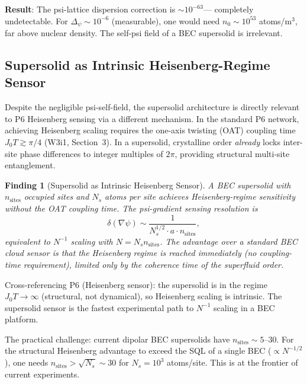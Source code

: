 \documentclass[11pt]{article}
\newtheorem{finding}[theorem]{Finding}
\theoremstyle{definition}
\theoremstyle{remark}
\begin{document}
\textbf{Result}: The psi-lattice dispersion correction is $\sim 10^{-63}$---
completely undetectable.  For $\Delta_\psi \sim 10^{-6}$ (measurable), one would
need $n_0 \sim 10^{53}$ atoms/m$^3$, far above nuclear density.  The self-psi
field of a BEC supersolid is irrelevant.

\subsection{Supersolid as Intrinsic Heisenberg-Regime Sensor}

Despite the negligible psi-self-field, the supersolid architecture is directly
relevant to P6 Heisenberg sensing via a different mechanism.  In the standard P6
network, achieving Heisenberg scaling requires the one-axis twisting (OAT)
coupling time $J_0 T \gtrsim \pi/4$ (W3i1, Section~3).  In a supersolid,
crystalline order \emph{already} locks inter-site phase differences to integer
multiples of $2\pi$, providing structural multi-site entanglement.

\begin{finding}[Supersolid as Intrinsic Heisenberg Sensor]
A BEC supersolid with $n_{\mathrm{sites}}$ occupied sites and $N_s$ atoms per
site achieves Heisenberg-regime sensitivity without the OAT coupling time.
The psi-gradient sensing resolution is
\begin{equation}
  \delta(\nabla\psi) \sim \frac{1}{N_s^{1/2}\cdot a \cdot n_{\mathrm{sites}}},
  \label{eq:ss-sensitivity}
\end{equation}
equivalent to $N^{-1}$ scaling with $N = N_s n_{\mathrm{sites}}$.
The advantage over a standard BEC cloud sensor is that the Heisenberg regime
is reached \emph{immediately} (no coupling-time requirement), limited only by
the coherence time of the superfluid order.
\end{finding}

Cross-referencing P6 (Heisenberg sensor): the supersolid is in the regime
$J_0 T \to \infty$ (structural, not dynamical), so Heisenberg scaling is
intrinsic.  The supersolid sensor is the fastest experimental path to
$N^{-1}$ scaling in a BEC platform.

The practical challenge: current dipolar BEC supersolids have
$n_{\mathrm{sites}} \sim 5\text{--}30$.  For the structural Heisenberg
advantage to exceed the SQL of a single BEC ($\propto N^{-1/2}$), one needs
$n_{\mathrm{sites}} > \sqrt{N_s} \sim 30$ for $N_s = 10^3$ atoms/site.
This is at the frontier of current experiments.
\end{document}

